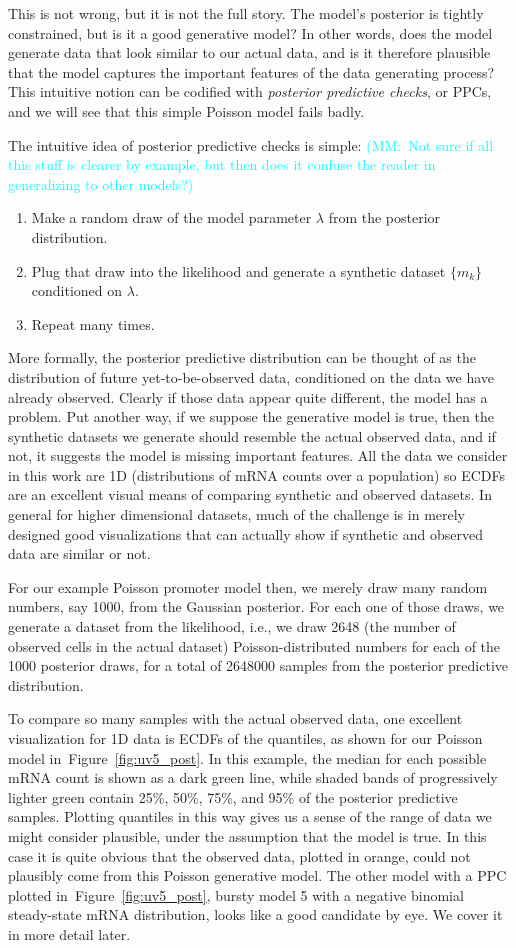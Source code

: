\documentclass[12pt]{article}%
\newcommand{\mmnote}[1]{\textcolor{cyan}{(MM:~#1)}}
\newcommand{\fig}[1]{Figure~\ref{#1}}
\begin{document}
This is not wrong, but it is not the full story. The model's
posterior is tightly constrained, but is it a good generative
model? In other words, does the model generate data that look similar
to our actual data, and is it therefore plausible that the
model captures the important features of the data generating
process? This intuitive notion can be codified with
\textit{posterior predictive checks}, or PPCs, and we will see
that this simple Poisson model fails badly.

The intuitive idea of posterior predictive checks is simple:
\mmnote{Not sure if all this stuff is clearer by example,
but then does it confuse the reader in generalizing to other models?}
\begin{enumerate}
\item Make a random draw of the model parameter $\lambda$
from the posterior distribution.
\item Plug that draw into the likelihood and generate
a synthetic dataset $\{m_k\}$ conditioned on $\lambda$.
\item Repeat many times.
\end{enumerate}
More formally, the posterior predictive distribution can be thought of
as the distribution of future yet-to-be-observed data,
conditioned on the data we have already observed.
Clearly if those data appear quite different,
the model has a problem. Put another way, if we suppose
the generative model is true, then the synthetic datasets
we generate should resemble the actual observed data, and if not,
it suggests the model is missing important features.
All the data we consider in this work are 1D (distributions of mRNA counts
over a population) so ECDFs are an excellent visual means of comparing
synthetic and observed datasets. In general for higher dimensional datasets,
much of the challenge is in merely designed good visualizations
that can actually show if synthetic and observed data are similar or not.

For our example Poisson promoter model then, we merely draw many
random numbers, say 1000, from the Gaussian posterior. For each one
of those draws, we generate a dataset from the likelihood,
i.e., we draw 2648 (the number of observed cells in the actual dataset)
Poisson-distributed numbers for each of the 1000 posterior draws,
for a total of 2648000 samples from the posterior predictive distribution.

To compare so many samples with the actual observed data,
one excellent visualization for 1D data is ECDFs of the quantiles,
as shown for our Poisson model in~\fig{fig:uv5_post}.
In this example, the median for each possible mRNA count is shown
as a dark green line, while shaded bands of progressively lighter green
contain 25\%, 50\%, 75\%, and 95\% of the posterior predictive samples.
Plotting quantiles in this way gives us a sense of the range of data
we might consider plausible, under the assumption that the model is true.
In this case it is quite obvious that the observed data, plotted in orange,
could not plausibly come from this Poisson generative model.
The other model with a PPC plotted in~\fig{fig:uv5_post},
bursty model 5 with a negative binomial steady-state mRNA distribution,
looks like a good candidate by eye. We cover it in more detail later.
\end{document}
